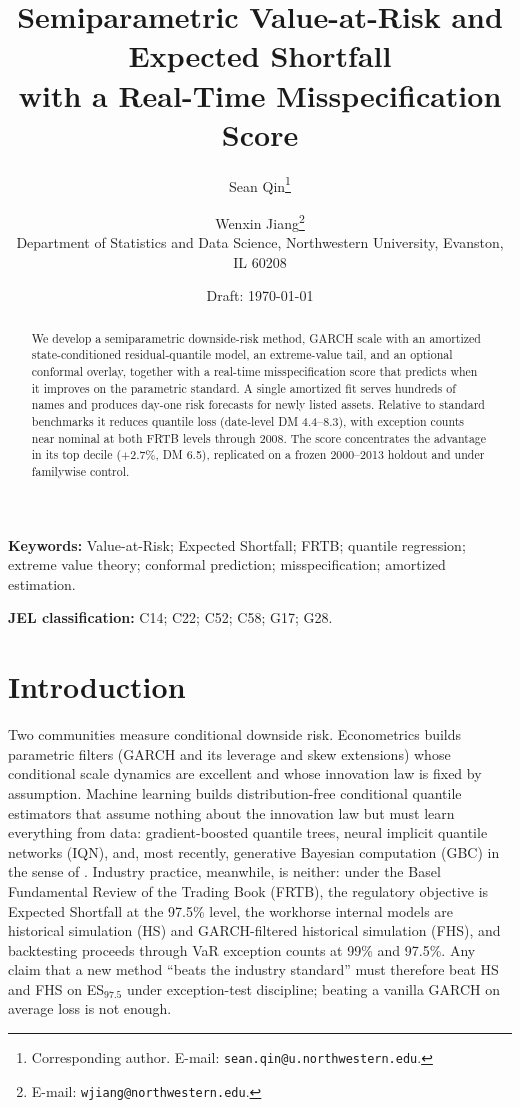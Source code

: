 \documentclass[11pt]{article}
\title{Semiparametric Value-at-Risk and Expected Shortfall\\
with a Real-Time Misspecification Score}
\author{%
  Sean Qin\thanks{Corresponding author. E-mail:
  \texttt{sean.qin@u.northwestern.edu}.}
  \and
  Wenxin Jiang\thanks{E-mail: \texttt{wjiang@northwestern.edu}.}\\[4pt]
  \normalsize Department of Statistics and Data Science, Northwestern
  University, Evanston, IL 60208}
\date{Draft: \today}
\theoremstyle{remark}
\begin{document}
\maketitle

\begin{abstract}
We develop a semiparametric downside-risk method, GARCH scale with an
amortized state-conditioned residual-quantile model, an extreme-value
tail, and an optional conformal overlay, together with a real-time
misspecification score that predicts when it improves on the parametric
standard. A single amortized fit serves hundreds of names and produces
day-one risk forecasts for newly listed assets. Relative to standard
benchmarks it reduces quantile loss (date-level DM 4.4--8.3), with
exception counts near nominal at both FRTB levels through 2008. The
score concentrates the advantage in its top decile ($+2.7\%$, DM 6.5),
replicated on a frozen 2000--2013 holdout and under familywise
control.
\end{abstract}

\noindent\textbf{Keywords:} Value-at-Risk; Expected Shortfall; FRTB;
quantile regression; extreme value theory; conformal prediction;
misspecification; amortized estimation.

\medskip
\noindent\textbf{JEL classification:} C14; C22; C52; C58; G17; G28.

\section*{Introduction}\label{sec:intro}

Two communities measure conditional downside risk. Econometrics builds
parametric filters (GARCH and its leverage and skew extensions) whose
conditional scale dynamics are excellent and whose innovation law
is fixed by assumption. Machine learning builds distribution-free
conditional quantile estimators that assume nothing about the
innovation law but must learn everything from data: gradient-boosted
quantile trees, neural implicit quantile networks (IQN), and, most
recently, generative Bayesian computation (GBC) in the sense of
\citet{polson2023gbc}. Industry practice, meanwhile, is neither: under the Basel
Fundamental Review of the Trading Book (FRTB), the regulatory objective
is Expected Shortfall at the 97.5\% level, the workhorse internal models
are historical simulation (HS) and GARCH-filtered historical simulation
(FHS), and backtesting proceeds through VaR exception counts at 99\% and
97.5\%. Any claim that a new method ``beats the industry standard'' must
therefore beat HS and FHS on ES$_{97.5}$ under exception-test
discipline; beating a vanilla GARCH on average loss is not enough.
\end{document}
